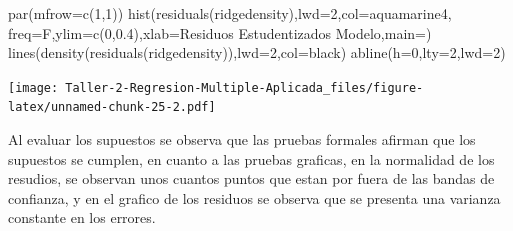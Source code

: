 \documentclass[
]{article}
\newenvironment{Shaded}{\begin{snugshade}}{\end{snugshade}}
\newcommand{\AttributeTok}[1]{\textcolor[rgb]{0.77,0.63,0.00}{#1}}
\newcommand{\DecValTok}[1]{\textcolor[rgb]{0.00,0.00,0.81}{#1}}
\newcommand{\FloatTok}[1]{\textcolor[rgb]{0.00,0.00,0.81}{#1}}
\newcommand{\FunctionTok}[1]{\textcolor[rgb]{0.00,0.00,0.00}{#1}}
\newcommand{\NormalTok}[1]{#1}
\newcommand{\StringTok}[1]{\textcolor[rgb]{0.31,0.60,0.02}{#1}}
\begin{document}
\begin{Shaded}
\begin{Highlighting}[]
\FunctionTok{par}\NormalTok{(}\AttributeTok{mfrow=}\FunctionTok{c}\NormalTok{(}\DecValTok{1}\NormalTok{,}\DecValTok{1}\NormalTok{))}
\FunctionTok{hist}\NormalTok{(}\FunctionTok{residuals}\NormalTok{(ridgedensity),}\AttributeTok{lwd=}\DecValTok{2}\NormalTok{,}\AttributeTok{col=}\StringTok{\textquotesingle{}aquamarine4\textquotesingle{}}\NormalTok{,}
\AttributeTok{freq=}\NormalTok{F,}\AttributeTok{ylim=}\FunctionTok{c}\NormalTok{(}\DecValTok{0}\NormalTok{,}\FloatTok{0.4}\NormalTok{),}\AttributeTok{xlab=}\StringTok{\textquotesingle{}Residuos Estudentizados Modelo\textquotesingle{}}\NormalTok{,}\AttributeTok{main=}\StringTok{\textquotesingle{}\textquotesingle{}}\NormalTok{)}
\FunctionTok{lines}\NormalTok{(}\FunctionTok{density}\NormalTok{(}\FunctionTok{residuals}\NormalTok{(ridgedensity)),}\AttributeTok{lwd=}\DecValTok{2}\NormalTok{,}\AttributeTok{col=}\StringTok{\textquotesingle{}black\textquotesingle{}}\NormalTok{)}
\FunctionTok{abline}\NormalTok{(}\AttributeTok{h=}\DecValTok{0}\NormalTok{,}\AttributeTok{lty=}\DecValTok{2}\NormalTok{,}\AttributeTok{lwd=}\DecValTok{2}\NormalTok{)}
\end{Highlighting}
\end{Shaded}

\texttt{[image: Taller-2-Regresion-Multiple-Aplicada\_files/figure-latex/unnamed-chunk-25-2.pdf]}

Al evaluar los supuestos se observa que las pruebas formales afirman que
los supuestos se cumplen, en cuanto a las pruebas graficas, en la
normalidad de los resudios, se observan unos cuantos puntos que estan
por fuera de las bandas de confianza, y en el grafico de los residuos se
observa que se presenta una varianza constante en los errores.
\end{document}
